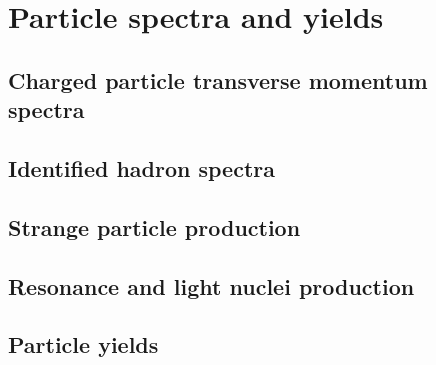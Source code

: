 \section{Particle spectra and yields}
\label{secks:spectra}
\subsection{Charged particle transverse momentum spectra}
\label{subsecks:transspectra}
\subsection{Identified hadron spectra}
\label{subsecks:identspectra}
\subsection{Strange particle production}
\label{subsecks:strangespectra}
\subsection{Resonance and light nuclei production}
\label{subsecks:resonace}
\subsection{Particle yields}
\label{subsecks:yields}
